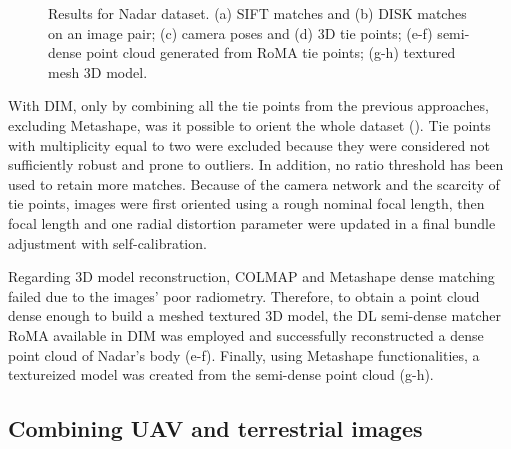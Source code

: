\begin{figure}
{  } \qquad
  \caption{Results for Nadar dataset. (a) SIFT matches and (b) DISK matches on an image pair; (c) camera poses and (d) 3D tie points; (e-f) semi-dense point cloud generated from RoMA tie points; (g-h) textured mesh 3D model.}
  \label{fig:5:res_nadar}
\end{figure}

With DIM, only by combining all the tie points from the previous approaches, excluding Metashape, was it possible to orient the whole dataset ().
Tie points with multiplicity equal to two were excluded because they were considered not sufficiently robust and prone to outliers. 
In addition, no ratio threshold has been used to retain more matches. 
Because of the camera network and the scarcity of tie points, images were first oriented using a rough nominal focal length, then focal length and one radial distortion parameter were updated in a final bundle adjustment with self-calibration.

Regarding 3D model reconstruction, COLMAP and Metashape dense matching failed due to the images' poor radiometry. 
Therefore, to obtain a point cloud dense enough to build a meshed textured 3D model, the DL semi-dense matcher RoMA available in DIM was employed and successfully reconstructed a dense point cloud of Nadar's body (e-f). 
Finally, using Metashape functionalities, a textureized model was created from the semi-dense point cloud (g-h).

\subsection{Combining UAV and terrestrial images}

